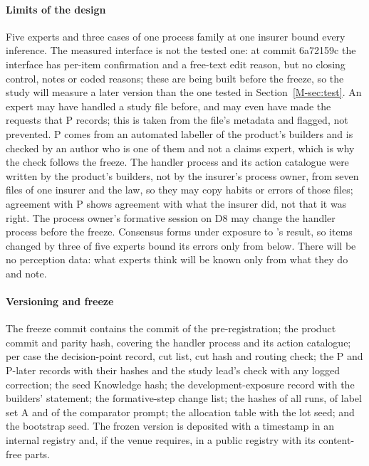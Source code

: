\paragraph{Limits of the design}
Five experts and three cases of one process family at one insurer bound every inference. The measured interface is not the tested one: at commit 6a72159c the interface has per-item confirmation and a free-text edit reason, but no closing control, notes or coded reasons; these are being built before the freeze, so the study will measure a later version than the one tested in Section~\ref{M-sec:test}. An expert may have handled a study file before, and may even have made the requests that P records; this is taken from the file's metadata and flagged, not prevented. P comes from an automated labeller of the product's builders and is checked by an author who is one of them and not a claims expert, which is why the check follows the freeze. The handler process and its action catalogue were written by the product's builders, not by the insurer's process owner, from seven files of one insurer and the law, so they may copy habits or errors of those files; agreement with P shows agreement with what the insurer did, not that it was right. The process owner's formative session on D8 may change the handler process before the freeze. Consensus forms under exposure to \casepath's result, so items changed by three of five experts bound its errors only from below. There will be no perception data: what experts think will be known only from what they do and note.

\paragraph{Versioning and freeze}
The freeze commit contains the commit of the pre-registration; the product commit and parity hash, covering the handler process and its action catalogue; per case the decision-point record, cut list, cut hash and routing check; the P and P-later records with their hashes and the study lead's check with any logged correction; the seed Knowledge hash; the development-exposure record with the builders' statement; the formative-step change list; the hashes of all runs, of label set A and of the comparator prompt; the allocation table with the lot seed; and the bootstrap seed. The frozen version is deposited with a timestamp in an internal registry and, if the venue requires, in a public registry with its content-free parts.
